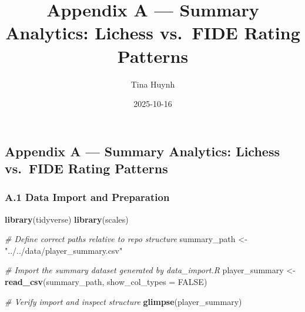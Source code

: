 \documentclass[
]{article}
\title{Appendix A --- Summary Analytics: Lichess vs.~FIDE Rating
Patterns}
\author{Tina Huynh}
\date{2025-10-16}
\newenvironment{Shaded}{\begin{snugshade}}{\end{snugshade}}
\newcommand{\AttributeTok}[1]{\textcolor[rgb]{0.13,0.29,0.53}{#1}}
\newcommand{\CommentTok}[1]{\textcolor[rgb]{0.56,0.35,0.01}{\textit{#1}}}
\newcommand{\ConstantTok}[1]{\textcolor[rgb]{0.56,0.35,0.01}{#1}}
\newcommand{\FunctionTok}[1]{\textcolor[rgb]{0.13,0.29,0.53}{\textbf{#1}}}
\newcommand{\NormalTok}[1]{#1}
\newcommand{\OtherTok}[1]{\textcolor[rgb]{0.56,0.35,0.01}{#1}}
\newcommand{\StringTok}[1]{\textcolor[rgb]{0.31,0.60,0.02}{#1}}
\begin{document}
\maketitle

{
\setcounter{tocdepth}{2}
\tableofcontents
}
\subsection{Appendix A --- Summary Analytics: Lichess vs.~FIDE Rating
Patterns}\label{appendix-a-summary-analytics-lichess-vs.-fide-rating-patterns}

\subsubsection{A.1 Data Import and
Preparation}\label{a.1-data-import-and-preparation}

\begin{Shaded}
\begin{Highlighting}[]
\FunctionTok{library}\NormalTok{(tidyverse)}
\FunctionTok{library}\NormalTok{(scales)}

\CommentTok{\# Define correct paths relative to repo structure}
\NormalTok{summary\_path }\OtherTok{\textless{}{-}} \StringTok{"../../data/player\_summary.csv"}

\CommentTok{\# Import the summary dataset generated by data\_import.R}
\NormalTok{player\_summary }\OtherTok{\textless{}{-}} \FunctionTok{read\_csv}\NormalTok{(summary\_path, }\AttributeTok{show\_col\_types =} \ConstantTok{FALSE}\NormalTok{)}

\CommentTok{\# Verify import and inspect structure}
\FunctionTok{glimpse}\NormalTok{(player\_summary)}
\end{Highlighting}
\end{Shaded}
\end{document}
